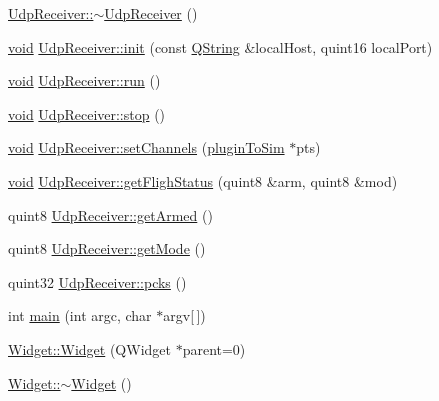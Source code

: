 \begin{DoxyCompactItemize}
\item 
\hyperlink{group___aero_sim_r_c_ga7125fcfef5ec56da34e1f3f2afc21c57}{\-Udp\-Receiver\-::$\sim$\-Udp\-Receiver} ()
\item 
\hyperlink{group___u_a_v_objects_plugin_ga444cf2ff3f0ecbe028adce838d373f5c}{void} \hyperlink{group___aero_sim_r_c_gad45fd7a1310445a52d17f2fe3ec7ab4b}{\-Udp\-Receiver\-::init} (const \hyperlink{group___u_a_v_objects_plugin_gab9d252f49c333c94a72f97ce3105a32d}{\-Q\-String} \&local\-Host, quint16 local\-Port)
\item 
\hyperlink{group___u_a_v_objects_plugin_ga444cf2ff3f0ecbe028adce838d373f5c}{void} \hyperlink{group___aero_sim_r_c_gaa4efe37e6d2da77ba95eb22705c1f1e2}{\-Udp\-Receiver\-::run} ()
\item 
\hyperlink{group___u_a_v_objects_plugin_ga444cf2ff3f0ecbe028adce838d373f5c}{void} \hyperlink{group___aero_sim_r_c_ga6269b9d1dd9625c71d9749c343e6be17}{\-Udp\-Receiver\-::stop} ()
\item 
\hyperlink{group___u_a_v_objects_plugin_ga444cf2ff3f0ecbe028adce838d373f5c}{void} \hyperlink{group___aero_sim_r_c_gab9cfcf389004c47e3af049bcef67fed9}{\-Udp\-Receiver\-::set\-Channels} (\hyperlink{structplugin_to_sim}{plugin\-To\-Sim} $\ast$pts)
\item 
\hyperlink{group___u_a_v_objects_plugin_ga444cf2ff3f0ecbe028adce838d373f5c}{void} \hyperlink{group___aero_sim_r_c_ga7aa237515699baba97a4c3e76a55d401}{\-Udp\-Receiver\-::get\-Fligh\-Status} (quint8 \&arm, quint8 \&mod)
\item 
quint8 \hyperlink{group___aero_sim_r_c_gaf0d473076876c13ba7df05e9ba6fd322}{\-Udp\-Receiver\-::get\-Armed} ()
\item 
quint8 \hyperlink{group___aero_sim_r_c_gaf1ad345905414c2c6c8883cdba472aae}{\-Udp\-Receiver\-::get\-Mode} ()
\item 
quint32 \hyperlink{group___aero_sim_r_c_ga4b48a3aa9531a445286790d5859da129}{\-Udp\-Receiver\-::pcks} ()
\item 
int \hyperlink{group___aero_sim_r_c_ga0ddf1224851353fc92bfbff6f499fa97}{main} (int argc, char $\ast$argv\mbox{[}$\,$\mbox{]})
\item 
\hyperlink{group___aero_sim_r_c_ga29531c7f141e461322981b3b579d4590}{\-Widget\-::\-Widget} (\-Q\-Widget $\ast$parent=0)
\item 
\hyperlink{group___aero_sim_r_c_gaa24f66bcbaaec6d458b0980e8c8eae65}{\-Widget\-::$\sim$\-Widget} ()
\end{DoxyCompactItemize}
